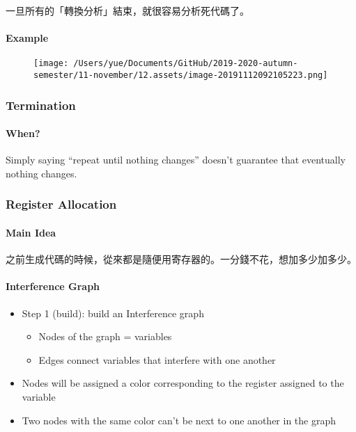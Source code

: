 \documentclass[
]{article}
\begin{document}
一旦所有的「轉換分析」結束，就很容易分析死代碼了。

\hypertarget{header-n95}{%
\paragraph{Example}\label{header-n95}}

\begin{figure}
\centering
\texttt{[image: /Users/yue/Documents/GitHub/2019-2020-autumn-semester/11-november/12.assets/image-20191112092105223.png]}
\caption{}
\end{figure}

\hypertarget{header-n97}{%
\subsubsection{Termination}\label{header-n97}}

\hypertarget{header-n98}{%
\paragraph{When?}\label{header-n98}}

Simply saying ``repeat until nothing changes'' doesn't guarantee that
eventually nothing changes.

\hypertarget{header-n100}{%
\subsubsection{Register Allocation}\label{header-n100}}

\hypertarget{header-n101}{%
\paragraph{Main Idea}\label{header-n101}}

之前生成代碼的時候，從來都是隨便用寄存器的。一分錢不花，想加多少加多少。

\hypertarget{header-n103}{%
\paragraph{Interference Graph}\label{header-n103}}

\begin{itemize}
\item
  Step 1 (build): build an Interference graph

  \begin{itemize}
  \item
    Nodes of the graph = variables
  \item
    Edges connect variables that interfere with one another
  \end{itemize}
\item
  Nodes will be assigned a color corresponding to the register assigned
  to the variable
\item
  Two nodes with the same color can't be next to one another in the
  graph
\end{itemize}
\end{document}
